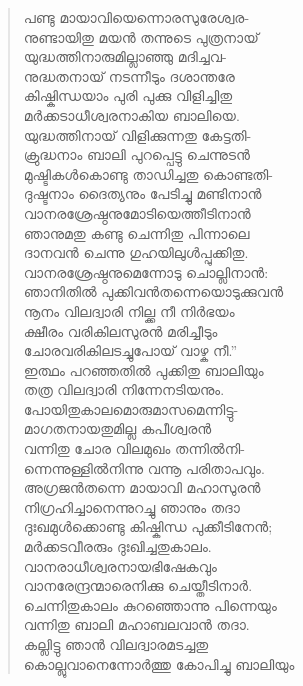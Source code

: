 \begin{verse}
പണ്ടു മായാവിയെന്നൊരസുരേശ്വര-\\
നുണ്ടായിതു മയന്‍ തന്നുടെ പുത്രനായ്\\
യുദ്ധത്തിനാരുമില്ലാഞ്ഞു മദിച്ചവ-\\
നുദ്ധതനായ് നടന്നീടും ദശാന്തരേ\\
കിഷ്കിന്ധയാം പുരി പുക്കു വിളിച്ചിതു\\
മര്‍ക്കടാധീശ്വരനാകിയ ബാലിയെ.\\
യുദ്ധത്തിനായ് വിളിക്കുന്നതു കേട്ടതി-\\
ക്രുദ്ധനാം ബാലി പുറപ്പെട്ടു ചെന്നുടന്‍\\
മുഷ്ടികള്‍കൊണ്ടു താഡിച്ചതു കൊണ്ടതി-\\
ദുഷ്ടനാം ദൈത്യനും പേടിച്ചു മണ്ടിനാന്‍\\
വാനരശ്രേഷ്ഠനുമോടിയെത്തീടിനാന്‍\\
ഞാനുമതു കണ്ടു ചെന്നിതു പിന്നാലെ\\
ദാനവന്‍ ചെന്നു ഗുഹയിലുള്‍പ്പുക്കിതു.\\
വാനരശ്രേഷ്ഠനുമെന്നോടു ചൊല്ലിനാന്‍:\\
ഞാനിതില്‍ പുക്കിവന്‍തന്നെയൊടുക്കുവന്‍\\
നൂനം വിലദ്വാരി നില്ക്ക നീ നിര്‍ഭയം\\
ക്ഷീരം വരികിലസുരന്‍ മരിച്ചീടും\\
ചോരവരികിലടച്ചുപോയ് വാഴ്ക നീ.”\\
ഇത്ഥം പറഞ്ഞതില്‍ പുക്കിതു ബാലിയും\\
തത്ര വിലദ്വാരി നിന്നേനടിയനും.\\
പോയിതുകാലമൊരുമാസമെന്നിട്ടു-\\
മാഗതനായതുമില്ല കപീശ്വരന്‍\\
വന്നിതു ചോര വിലമുഖം തന്നില്‍നി-\\
ന്നെന്നുള്ളില്‍നിന്നു വന്നൂ പരിതാപവും.\\
അഗ്രജന്‍തന്നെ മായാവി മഹാസുരന്‍\\
നിഗ്രഹിച്ചാനെന്നുറച്ചു ഞാനും തദാ\\
ദുഃഖമുള്‍ക്കൊണ്ടു കിഷ്കിന്ധ പുക്കീടിനേന്‍;\\
മര്‍ക്കടവീരരും ദുഃഖിച്ചതുകാലം.\\
വാനരാധീശ്വരനായഭിഷേകവും\\
വാനരേന്ദ്രന്മാരെനിക്കു ചെയ്തീടിനാര്‍.\\
ചെന്നിതുകാലം കുറഞ്ഞൊന്നു പിന്നെയും\\
വന്നിതു ബാലി മഹാബലവാന്‍ തദാ.\\
കല്ലിട്ടു ഞാന്‍ വിലദ്വാരമടച്ചതു\\
കൊല്ലുവാനെന്നോര്‍ത്തു കോപിച്ചു ബാലിയും\\

\end{verse}
